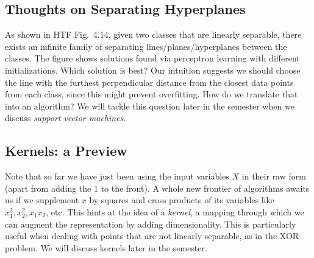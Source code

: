\documentclass[a4paper]{article}
\begin{document}
\subsection{Thoughts on Separating Hyperplanes}
As shown in HTF Fig.\ 4.14, given two classes that are linearly separable, there exists an infinite family of separating lines/planes/hyperplanes between the classes.  The figure shows solutions found via perceptron learning with different initializations.  Which solution is best?  Our intuition suggests we should choose the line with the furthest  perpendicular distance from the closest data points from each class, since this might prevent overfitting. How do we translate that into an algorithm?  We will tackle this question later in the semester when we discuss \emph{support vector machines}.

\subsection{Kernels: a Preview}
Note that so far we have just been using the input variables $X$ in their raw form (apart from adding the 1 to the front). A whole new frontier of algorithms awaits us if we supplement $x$ by squares and cross products of its variables like $x_1^2,x_2^2, x_1x_2$, etc. This hints at the idea of a \textit{kernel}, a mapping through which we can augment the representation by adding dimensionality. This is particularly useful when dealing with points that are not linearly separable, as in the XOR problem. We will discuss kernels later in the semester.
\end{document}
